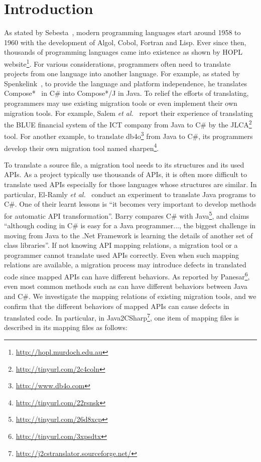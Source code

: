 \section{Introduction}
\label{sec:introduction}
As stated by Sebesta~\cite{sebesta2002concepts}, modern programming languages start around 1958 to 1960 with the development of Algol, Cobol, Fortran and Lisp. Ever since then, thousands of programming languages came into existence as shown by HOPL website\footnote{\url{http://hopl.murdoch.edu.au}}. For various considerations, programmers often need to translate projects from one language into another language. For example, as stated by Spenkelink~\cite{spenkelink2007porting}, to provide the language and platform independence, he translates Compose*~\cite{garcia-compose} in C\# into Compose*/J in Java. To relief the efforts of translating, programmers may use existing migration tools or even implement their own migration tools. For example, Salem \emph{et al.}~\cite{AgtashAEMBS06} report their experience of translating the BLUE financial system of the ICT company from Java to C\# by the JLCA\footnote{\url{http://tinyurl.com/2c4coln}} tool. For another example, to translate db4o\footnote{\url{http://www.db4o.com}} from Java to C\#, its programmers develop their own migration tool named sharpen\footnote{\url{http://tinyurl.com/22rsnsk}}.

To translate a source file, a migration tool needs to its structures and its used APIs. As a project typically use thousands of APIs, it is often more difficult to translate used APIs especially for those languages whose structures are similar. In particular, El-Ramly \emph{et al.}~\cite{el2006experiment} conduct an experiment to translate Java programs to C\#. One of their learnt lessons is ``it
becomes very important to develop methods for
automatic API transformation''. Barry compares C\# with Java\footnote{\url{http://tinyurl.com/26d8xcp}}, and claims ``although coding in C\# is easy for a Java programmer..., the biggest challenge in moving from Java to the .Net Framework is learning the details of another set of class libraries''. If not knowing API mapping relations, a migration tool or a programmer cannot translate used APIs correctly. Even when such mapping relations are available, a migration process may introduce defects in translated code since mapped APIs can have different behaviors. As reported by Panesar\footnote{\url{http://tinyurl.com/3xpsdtx}}, even most common methods such as  can have different behaviors between Java and C\#. We investigate the mapping relations of existing migration tools, and we confirm that the different behaviors of mapped APIs can cause defects in translated code. In particular, in Java2CSharp\footnote{\url{http://j2cstranslator.sourceforge.net/}}, one item of mapping files is described in its mapping files as follows:

